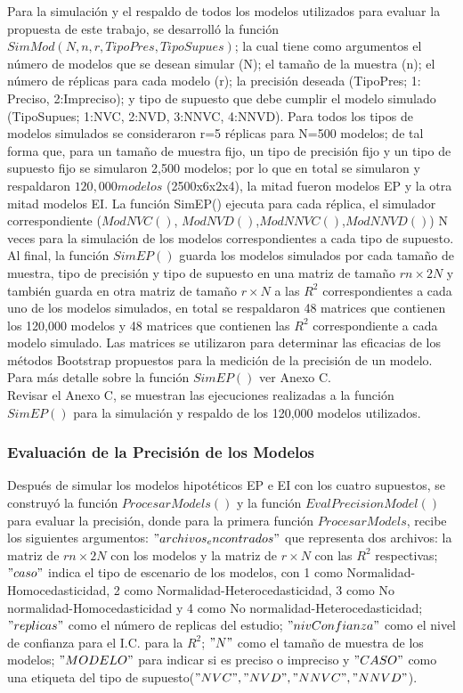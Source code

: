 Para la simulación y el respaldo de todos los modelos utilizados para evaluar la propuesta de este trabajo, se desarrolló la función $SimMod(N,n,r,TipoPres,TipoSupues)$; la cual tiene como argumentos el número de modelos que se desean simular (N); el tamaño de la muestra (n); el número de réplicas para cada modelo (r);  la precisión deseada (TipoPres; 1: Preciso, 2:Impreciso); y tipo de supuesto que debe cumplir el modelo simulado (TipoSupues; 1:NVC, 2:NVD, 3:NNVC, 4:NNVD). Para todos los tipos de modelos simulados se consideraron r=5 réplicas para N=500 modelos; de tal forma que, para un tamaño de muestra fijo, un tipo de precisión fijo y un tipo de supuesto fijo se simularon 2,500 modelos; por lo que en total se simularon y respaldaron $120,000 modelos$ (2500x6x2x4), la mitad fueron modelos EP y la otra mitad modelos EI.
La función SimEP() ejecuta para cada réplica, el simulador correspondiente ($ModNVC()$, $ModNVD()$,$ ModNNVC()$,$ ModNNVD()$)  N veces para la simulación de los modelos correspondientes a cada tipo de supuesto. Al final, la función $SimEP()$ guarda los modelos simulados por cada tamaño de muestra, tipo de precisión y tipo de supuesto en una matriz de tamaño $rn \times 2N$ y también guarda en otra matriz de tamaño $r \times N$ a las $R^2$ correspondientes a cada uno de los modelos simulados, en total se respaldaron 48 matrices que contienen los 120,000 modelos y 48 matrices que contienen las $R^2$ correspondiente a cada modelo simulado. Las matrices se utilizaron para determinar las eficacias de los métodos Bootstrap propuestos para la medición de la precisión de un modelo. Para más detalle sobre la función $SimEP()$ ver Anexo C.\\

Revisar el Anexo C, se muestran las ejecuciones realizadas a la función $SimEP ()$ para la simulación y respaldo de los 120,000 modelos utilizados. \\


\subsubsection{Evaluación de la Precisión de los Modelos}

Después de simular los modelos hipotéticos EP e EI con los cuatro supuestos, se construyó la función $ProcesarModels()$ y la función $EvalPrecisionModel()$ para evaluar la precisión, donde para la primera función $ProcesarModels$, recibe los siguientes argumentos: $"archivos_encontrados"$ que representa dos archivos: la matriz de $rn \times 2N$ con los modelos y la matriz de $r \times N$ con las $R^2$ respectivas; $"caso"$ indica el tipo de escenario de los modelos, con 1 como Normalidad- Homocedasticidad, 2 como Normalidad-Heterocedasticidad, 3 como No normalidad-Homocedasticidad y 4 como No normalidad-Heterocedasticidad; $"replicas"$ como el número de replicas del estudio; $"nivConfianza"$ como el nivel de confianza para el I.C. para la $R^2$; $"N"$ como el tamaño de muestra de los modelos; $"MODELO"$ para indicar si es preciso o impreciso y $"CASO"$ como una etiqueta del tipo de supuesto($"NVC","NVD","NNVC","NNVD"$).\\


